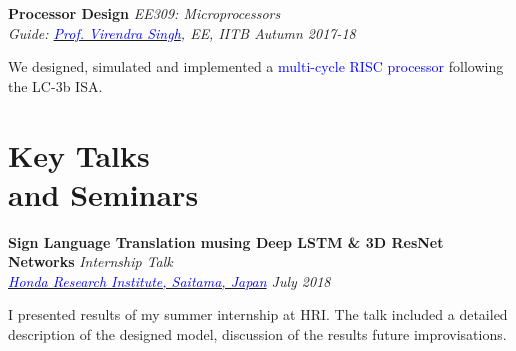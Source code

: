 \documentclass[margin,line, 9pt]{res}
\newenvironment{list1}{
  \begin{list}{\ding{113}}{%
      \setlength{\itemsep}{0in}
      \setlength{\parsep}{0in} \setlength{\parskip}{0in}
      \setlength{\topsep}{0in} \setlength{\partopsep}{0in} 
      \setlength{\leftmargin}{0.17in}}}{\end{list}}
\begin{document}
\begin{resume}
{\bf Processor Design} \hfill \textit{EE309: Microprocessors} \\
{\em Guide: \href{https://www.ee.iitb.ac.in/~viren/}{\textcolor{blue}{Prof. Virendra Singh}}, EE, IITB \hfill Autumn 2017-18} \\
\vspace*{-.15in}
\begin{list1}
\item[] We designed, simulated and implemented a {\textcolor{blue} {multi-cycle RISC processor}} following the LC-3b ISA.
\end{list1}



\section{\sc Key Talks \\ and Seminars}

{\bf Sign Language Translation musing Deep LSTM \& 3D ResNet Networks} \hfill {\em Internship Talk} \\
{\em \href{http://www.jp.honda-ri.com/en/}{\textcolor{blue}{Honda Research Institute, Saitama, Japan}} \hfill July 2018} \\
\vspace*{-.15in}
\begin{list1}
\item[] I presented results of my summer internship at HRI. The talk included a detailed description of the designed model, discussion of the results future improvisations. 
\end{list1}

\vspace*{-0.1in}



\end{resume}
\end{document}
